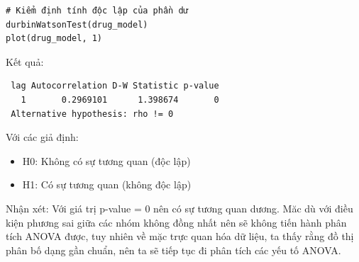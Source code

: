 \begin{itemize}
\begin{lstlisting}
# Kiểm định tính độc lập của phần dư
durbinWatsonTest(drug_model)
plot(drug_model, 1)
\end{lstlisting}

Kết quả:
\begin{lstlisting}
 lag Autocorrelation D-W Statistic p-value
   1       0.2969101      1.398674       0
 Alternative hypothesis: rho != 0
\end{lstlisting}
Với các giả định:
    \begin{itemize}
        \item H0: Không có sự tương quan (độc lập)
        \item H1: Có sự tương quan (không độc lập)
    \end{itemize}
Nhận xét: Với giá trị p-value = 0 nên có sự tương quan dương.
Măc dù với điều kiện phương sai giữa các nhóm không đồng nhất nên sẽ không tiến hành phân
tích ANOVA được, tuy nhiên về mặc trực quan hóa dữ liệu, ta thấy rằng đồ thị phân bố dạng
gần chuẩn, nên ta sẽ tiếp tục đi phân tích các yếu tố ANOVA.

\newpage


\end{itemize}
